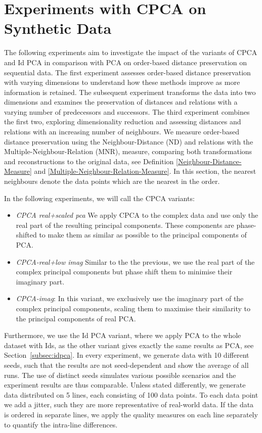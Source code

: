 \documentclass[pdftex,12pt,a4paper]{report}
\begin{document}
\section{Experiments with CPCA on Synthetic Data}
The following experiments aim to investigate the impact of the variants of CPCA and Id PCA in comparison with PCA on order-based distance preservation on sequential data.
The first experiment assesses order-based distance preservation with varying dimensions to understand how these methods improve as more information is retained.
The subsequent experiment transforms the data into two dimensions and examines the preservation of distances and relations with a varying number of predecessors and successors.
The third experiment combines the first two, exploring dimensionality reduction and assessing distances and relations with an increasing number of neighbours. We measure order-based distance preservation using the Neighbour-Distance (ND) and relations with the Multiple-Neighbour-Relation (MNR), measure, comparing both transformations and reconstructions to the original data, see Definition \ref{Neighbour-Distance-Measure} and \ref{Multiple-Neighbour-Relation-Measure}.
In this section, the nearest neighbours denote the data points which are the nearest in the order.

In the following experiments, we will call the CPCA variants:
\begin{itemize}
    \item \textit{CPCA real+scaled pca} We apply CPCA to the complex data and use only the real part of the resulting principal components. These components are phase-shifted to make them as similar as possible to the principal components of PCA.
    \item \textit{CPCA-real+low imag} Similar to the the previous, we use the real part of the complex principal components but phase shift them to minimise their imaginary part.
    \item \textit{CPCA-imag}: In this variant, we exclusively use the imaginary part of the complex principal components, scaling them to maximise their similarity to the principal components of real PCA.
\end{itemize}
Furthermore, we use the Id PCA variant, where we apply PCA to the whole dataset with Ids, as the other variant gives exactly the same results as PCA, see Section~\ref{subsec:idpca}.
In every experiment, we generate data with 10 different seeds, such that the results are not seed-dependent and show the average of all runs.
The use of distinct seeds simulates various possible scenarios and the experiment results are thus comparable.
Unless stated differently, we generate data distributed on 5 lines, each consisting of 100 data points.
To each data point we add a jitter, such they are more representative of real-world data.
If the data is ordered in separate lines, we apply the quality measures on each line separately to quantify the intra-line differences.
\end{document}

